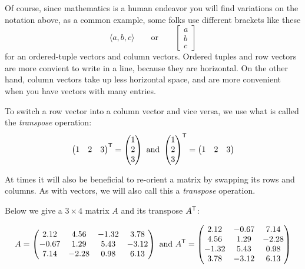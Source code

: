 \documentclass{ximera}
\begin{document}
\begin{exploration}
        
        Of course, since mathematics is a human endeavor you will find variations on the notation above, as a common example, some folks use different brackets like these
        \[
        \langle a, b, c\rangle \qquad\text{or}\qquad
        \begin{bmatrix}
          a\\
          b\\
          c
        \end{bmatrix}
        \]
        for an ordered-tuple vectors and column vectors. Ordered tuples and
        row vectors are more convient to write in a line, because they are
        horizontal. On the other hand, column vectors take up less horizontal
        space, and are more convenient when you have vectors with many entries.
        
        
        \begin{definition}
          To switch a row vector into a column vector and vice versa, we use what is called the \emph{transpose} operation:
          \[
          \begin{pmatrix} 1 &  2 & 3 \end{pmatrix}^{\mathsf{T}} =
          \begin{pmatrix} 1 \\ 2 \\ 3 \end{pmatrix}
          \text{ }\text{and}\text{ }
          \begin{pmatrix} 1 \\ 2 \\ 3 \end{pmatrix}^{\mathsf{T}} =
          \begin{pmatrix} 1 &  2 & 3 \end{pmatrix}
          \]
        \end{definition}

        At times it will also be beneficial to re-orient a matrix by swapping its rows and columns. As with vectors, we will also call this a \emph{transpose} operation. 
        
        \begin{example}

            Below we give a $3\times 4$ matrix $A$ and its transpose $A^{\mathsf{T}}$:

            \[
A=\begin{pmatrix}
    2.12 & 4.56 & -1.32 & 3.78 \\
    -0.67 & 1.29 & 5.43 & -3.12 \\
    7.14 & -2.28 & 0.98 & 6.13
\end{pmatrix}
\text{ } \text{and} \text{ }
A^{\mathsf{T}}=\begin{pmatrix}
    2.12 & -0.67 & 7.14 \\
    4.56 & 1.29 & -2.28 \\
    -1.32 & 5.43 & 0.98 \\
    3.78 & -3.12 & 6.13
\end{pmatrix}
\]


\end{example}
\end{exploration}
\end{document}
